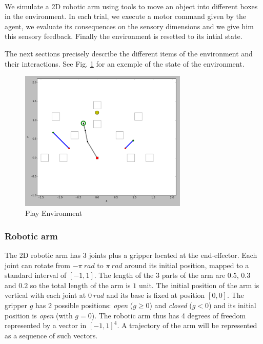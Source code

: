 \documentclass[10pt,letterpaper]{article}
\begin{document}
		\paragraph{}
		We simulate a 2D robotic arm using tools to move an object into different boxes in the environment. 		
		In each trial, we execute a motor command given by the agent, we evaluate its consequences on the sensory dimensions and we give him
		this sensory feedback. Finally the environment is resetted to its intial state.
		
		The next sections precisely describe the different items of the environment and their interactions.	
		See Fig. \ref{env} for an exemple of the state of the environment. 
		
		\begin{figure}[h]
			\centering
			\includegraphics[width=8cm]{./include/tools.png}
			\caption{Play Environment}
			\label{env}
		\end{figure}
			

		\subsubsection{Robotic arm}
		
			The 2D robotic arm has 3 joints plus a gripper located at the end-effector.
			Each joint can rotate from $-\pi~rad$ to $\pi~rad$ around its initial position, mapped to a standard interval of $[-1,1]$.
			The length of the 3 parts of the arm are $0.5$, $0.3$ and $0.2$ so the total length of the arm is $1$ unit.
			The initial position of the arm is vertical with each joint at $0~rad$ and its base is fixed at position $[0, 0]$.
			The gripper $g$ has 2 possible positions: \textit{open} ($g \geq 0$) and \textit{closed} ($g < 0$) and its initial position is \textit{open} (with $g = 0$).
			The robotic arm thus has 4 degrees of freedom represented by a vector in $[-1,1]^4$.
			A trajectory of the arm will be represented as a sequence of such vectors.
		
\end{document}
